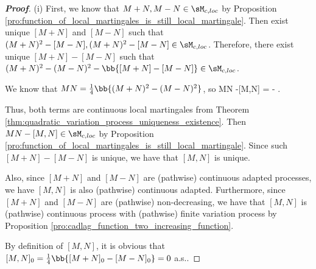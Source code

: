 \begin{proof}[\bf Proof]
\ben
\item [(i)] First, we know that $M+N,M-N\in \sM_{c,loc}$ by Proposition \ref{pro:function_of_local_martingales_is_still_local_martingale}. Then exist unique $[M+N]$ and $[M-N]$ such that $(M+N)^2 - [M-N],(M+N)^2 - [M-N]\in \sM_{c,loc}$. Therefore, there exist unique $[M+N]-[M-N]$ such that $(M+N)^2-(M-N)^2 - \bb{[M+N]-[M-N]} \in \sM_{c,loc}$.

We know that $M N = \frac 14\bb{(M+N)^2-(M-N)^2}$, so
\be
MN -[M,N] =  - .
\ee

Thus, both terms are continuous local martingales from Theorem \ref{thm:quadratic_variation_process_uniqueness_existence}. Then $MN -[M,N]\in \sM_{c,loc}$ by Proposition \ref{pro:function_of_local_martingales_is_still_local_martingale}. %
Since such $[M+N]-[M-N]$ is unique, we have that $[M,N]$ is unique. %

Also, since $[M+N]$ and $[M-N]$ are (pathwise) continuous adapted processes, we have $[M,N]$ is also (pathwise) continuous adapted. Furthermore, since $[M+N]$ and $[M-N]$ are (pathwise) non-decreasing, we have that $[M,N]$ is (pathwise) continuous process with (pathwise) finite variation process by Proposition \ref{pro:cadlag_function_two_increasing_function}.

By definition of $[M,N]$, it is obvious that $[M,N]_0 = \frac 14 \bb{[M+N]_0 - [M-N]_0} = 0$ a.s..



\end{proof}

